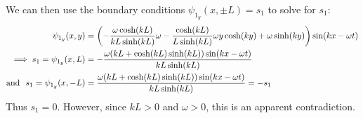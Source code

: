 \documentclass{article} %
\theoremstyle{plain}
\numberwithin{equation}{section} %
\numberwithin{figure}{section} %
\numberwithin{table}{section} %
\begin{document}
We can then use the boundary conditions $\psi_{1_y}(x, \pm L) = s_1$ to solve for $s_1$:
\begin{align*}
    \psi_{1_y}(x,y) &= \qty(-\frac{\omega\cosh(kL)}{kL\sinh(kL)}\omega - \frac{\cosh(kL)}{L\sinh(kL)}\omega y \cosh(ky) + \omega \sinh(k y))\sin(kx - \omega t) \\
    \implies s_1 = \psi_{1_y}(x,L) &= -\frac{\omega(kL + \cosh(kL)\sinh(kL))\sin(kx - \omega t)}{kL \sinh(kL)} \\
    \text{and }\ s_1 = \psi_{1_y}(x,-L) &= \frac{\omega(kL + \cosh(kL)\sinh(kL))\sin(kx - \omega t)}{kL \sinh(kL)} = -s_1
\end{align*}
Thus $s_1 = 0$.  However, since $kL > 0$ and $\omega > 0$, this is an apparent contradiction.
\end{document}
